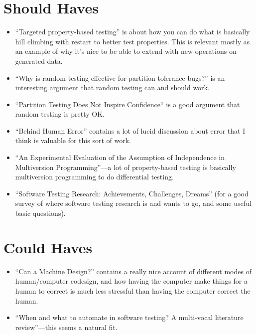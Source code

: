 \section{Should Haves}

\begin{itemize}
\item ``Targeted property-based testing''\cite{DBLP:conf/issta/LoscherS17} is about how you can do what is basically hill climbing with restart to better test properties.
This is relevant mostly as an example of why it's nice to be able to extend with new operations on generated data.
\item ``Why is random testing effective for partition tolerance bugs?''\cite{DBLP:journals/pacmpl/MajumdarN18} is an interesting argument that random testing can and should work.
\item ``Partition Testing Does Not Inspire Confidence``\cite{DBLP:journals/tse/HamletT90} is a good argument that random testing is pretty OK.
\item ``Behind Human Error''\cite{BehindHumanError} contains a lot of lucid discussion about error that I think is valuable for this sort of work.
\item ``An Experimental Evaluation of the Assumption of Independence in Multiversion Programming''\cite{DBLP:journals/tse/KnightL86}---a
lot of property-based testing is basically multiversion programming to do differential testing.
\item ``Software Testing Research: Achievements, Challenges, Dreams''\cite{DBLP:conf/icse/Bertolino07} (for a good survey of where software testing research is and wants to go, and some useful basic questions).
\end{itemize}

\section{Could Haves}

\begin{itemize}
\item ``Can a Machine Design?''\cite{doi:10.1162/07479360152681083} contains a really nice account of different modes of human/computer codesign,
and how having the computer make things for a human to correct is much less stressful than having the computer correct the human.
\item ``When and what to automate in software testing? {A} multi-vocal literature review''\cite{DBLP:journals/infsof/GarousiM16}---this
seems a natural fit.
\end{itemize}




